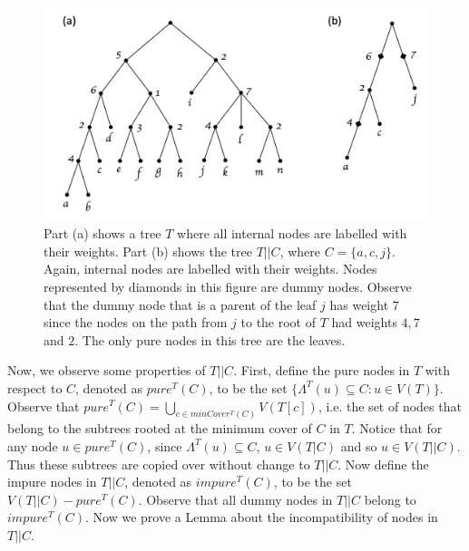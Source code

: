 \documentclass{article}
\newcommand{\leafset}{\Lambda}
\begin{document}
    \begin{figure}[ht]
        \includegraphics[scale=0.5]{dummynodes}
        \centering
        \caption[Constructing the tree $T||C$]{Part (a) shows a tree $T$ where all internal nodes are labelled with their weights. Part (b) shows the tree $T||C$, where $C = \{a, c, j\}$. Again, internal nodes are labelled with their weights. Nodes represented by diamonds in this figure are dummy nodes. Observe that the dummy node that is a parent of the leaf $j$ has weight $7$ since the nodes on the path from $j$ to the root of $T$ had weights $4, 7$ and $2$. The only pure nodes in this tree are the leaves.}
        \label{fig:dummynodes}
    \end{figure}

    Now, we observe some properties of $T||C$. First, define the pure nodes in $T$ with respect to $C$, denoted as $pure^{T}(C)$, to be the set $\{\leafset^{T}(u) \subseteq C : u \in V(T)\}$. Observe that $pure^{T}(C) = \bigcup_{c \in minCover^{T}(C)} V(T[c])$, i.e. the set of nodes that belong to the subtrees rooted at the minimum cover of $C$ in $T$. Notice that for any node $u \in pure^{T}(C)$, since $\leafset^{T}(u) \subseteq C$, $u \in V(T|C)$ and so $u \in V(T||C)$. Thus these subtrees are copied over without change to $T||C$. Now define the impure nodes in $T||C$, denoted as $impure^{T}(C)$, to be the set $V(T||C) - pure^{T}(C)$. Observe that all dummy nodes in $T||C$ belong to $impure^{T}(C)$. Now we prove a Lemma about the incompatibility of nodes in $T||C$.
    \newline
\end{document}
